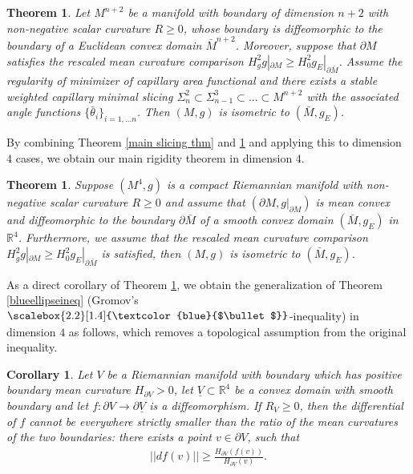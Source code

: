 \documentclass[11pt,letterpaper]{amsart}
\newcommand{\fillellipse}{\raisebox{0.2ex}{\scalebox{2.2}[1.4]{\textcolor{blue}{$\bullet$}}}}
\newtheorem{cor}{Corollary}[section]
\newtheorem{thm}[problem]{Theorem}
\begin{document}
\begin{thm} \label{main rigidity in general dimension}
    Let $M^{n+2}$ be a manifold with boundary of dimension $n+2$ with non-negative scalar curvature $R \ge 0$, whose boundary is diffeomorphic to the boundary of a Euclidean convex domain $\bar{M}^{n+2}$. Moreover, suppose that $\partial M$ satisfies the rescaled mean curvature comparison $H_g^2g|_{\partial M}\geq H_0^2g_{E}|_{\partial \bar{M}}$. Assume the regularity of minimizer of capillary area functional and there exists a stable weighted capillary minimal slicing  $\Sigma_{n}^{2} \subset \Sigma_{n-1}^{3} \subset ... \subset M^{n+2}$ with the associated angle functions $\{\bar{\theta}_{i}\}_{i=1,...n}$. Then $(M,g)$ is isometric to $(\bar{M}, g_{E})$.
\end{thm}

By combining Theorem \ref{main slicing thm} and \ref{main rigidity in general dimension} and applying this to dimension $4$ cases, we obtain our main rigidity theorem in dimension $4$.
\begin{thm}\label{main rigidity thm}
    Suppose $(M^4,g)$ is a compact Riemannian manifold with non-negative scalar curvature $R \ge 0$ and assume that $(\partial M,g|_{\partial M})$ is mean convex and diffeomorphic to the boundary $\partial \bar{M}$ of a smooth convex domain $(\bar{M},g_E)$ in $\mathbb R^4$. Furthermore, we assume that the rescaled mean curvature comparison $H_g^2g|_{\partial M}\geq H_0^2g_{E}|_{\partial \bar{M}}$ is satisfied, then $(M,g)$ is isometric to $(\bar{M},g_E)$.
\end{thm}
As a direct corollary of Theorem \ref{main rigidity thm}, we obtain the generalization of Theorem \ref{blueellipseineq} (Gromov's $\fillellipse$-inequality) in dimension $4$ as follows, which removes a topological assumption from the original inequality.
\begin{cor}
    Let $V$ be a Riemannian manifold with boundary which has positive boundary mean curvature $H_{\partial V} >0$, let $\underline{V} \subset \mathbb{R}^{4}$ be a convex domain with smooth boundary and let $f: \partial V \rightarrow \partial \underline{V}$ is a diffeomorphism. If $R_{V} \ge 0$, then the differential of $f$ cannot be everywhere strictly smaller than the ratio of the mean curvatures of the two boundaries: there exists a point $v \in \partial V$, such that
    \begin{align} \label{mccomparisoncondition}
    ||df(v)|| \ge \frac{H_{\partial V}(f(v))}{H_{\partial \underline{V}}(v)}.
    \end{align}
\end{cor}
\end{document}

